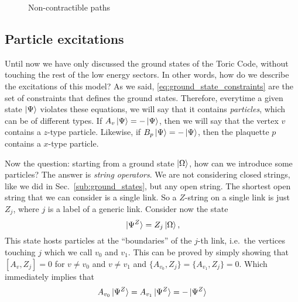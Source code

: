 \begin{figure}[t]
    \centering
    
    \caption{Non-contractible paths}
\end{figure}




\subsection{Particle excitations}%
\label{sub:particle_excitations}

Until now we have only discussed the ground states of the Toric Code, without touching the rest of the low energy sectors.
In other words, how do we describe the excitations of this model?
As we said, \eqref{eq:ground_state_constraints} are the set of constraints that defines the ground states.
Therefore, everytime a given state $\ket{\Psi}$ violates these equations, we will say that it contains \emph{particles}, which can be of different types.
If $A_v \ket{\Psi} = - \ket{\Psi}$, then we will say that the vertex $v$ contains a $z$-type particle.
Likewise, if $B_p \ket{\Psi} = - \ket{\Psi}$, then the plaquette $p$ contains a $x$-type particle.

Now the question: starting from a ground state $\ket{\Omega}$, how can we introduce some particles?
The answer is \emph{string operators}.
We are not considering closed strings, like we did in Sec.~\ref{sub:ground_states}, but any open string.
The shortest open string that we can consider is a single link.
So a $Z$-string on a single link is just $Z_j$, where $j$ is a label of a generic link.
Consider now the state
\begin{equation}
    \ket*{\Psi^Z} = Z_j \ket{\Omega},
\end{equation}
This state hosts particles at the ``boundaries'' of the $j$-th link, i.e.~the vertices touching $j$ which we call $v_0$ and $v_1$.
This can be proved by simply showing that $[ A_v, Z_j ] = 0$ for $v \neq v_0$ and $v \neq v_1$ and $\{ A_{v_0}, Z_j \} = \{ A_{v_1}, Z_j \} = 0$.
Which immediately implies that
\begin{equation}
    A_{v_0} \ket*{\Psi^Z} = A_{v_1} \ket*{\Psi^Z} = - \ket*{\Psi^Z}
\end{equation}


